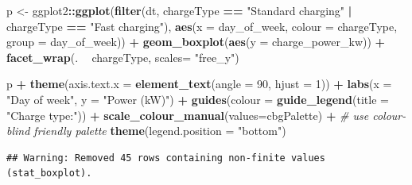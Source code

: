 \documentclass[]{article}
\newenvironment{Shaded}{\begin{snugshade}}{\end{snugshade}}
\newcommand{\KeywordTok}[1]{\textcolor[rgb]{0.13,0.29,0.53}{\textbf{#1}}}
\newcommand{\DataTypeTok}[1]{\textcolor[rgb]{0.13,0.29,0.53}{#1}}
\newcommand{\DecValTok}[1]{\textcolor[rgb]{0.00,0.00,0.81}{#1}}
\newcommand{\StringTok}[1]{\textcolor[rgb]{0.31,0.60,0.02}{#1}}
\newcommand{\CommentTok}[1]{\textcolor[rgb]{0.56,0.35,0.01}{\textit{#1}}}
\newcommand{\OperatorTok}[1]{\textcolor[rgb]{0.81,0.36,0.00}{\textbf{#1}}}
\newcommand{\NormalTok}[1]{#1}
\begin{document}
\begin{Shaded}
\begin{Highlighting}[]
\NormalTok{p <-}\StringTok{ }\NormalTok{ggplot2}\OperatorTok{::}\KeywordTok{ggplot}\NormalTok{(}\KeywordTok{filter}\NormalTok{(dt, chargeType }\OperatorTok{==}\StringTok{ "Standard charging"} \OperatorTok{|}\StringTok{ }\NormalTok{chargeType }\OperatorTok{==}\StringTok{ "Fast charging"}\NormalTok{), }\KeywordTok{aes}\NormalTok{(}\DataTypeTok{x =}\NormalTok{ day_of_week, }\DataTypeTok{colour =}\NormalTok{ chargeType, }\DataTypeTok{group =}\NormalTok{ day_of_week)) }\OperatorTok{+}
\StringTok{  }\KeywordTok{geom_boxplot}\NormalTok{(}\KeywordTok{aes}\NormalTok{(}\DataTypeTok{y =}\NormalTok{ charge_power_kw)) }\OperatorTok{+}
\StringTok{  }\KeywordTok{facet_wrap}\NormalTok{(. }\OperatorTok{~}\StringTok{ }\NormalTok{chargeType, }\DataTypeTok{scales=} \StringTok{"free_y"}\NormalTok{)}

\NormalTok{p }\OperatorTok{+}\StringTok{ }\KeywordTok{theme}\NormalTok{(}\DataTypeTok{axis.text.x =} \KeywordTok{element_text}\NormalTok{(}\DataTypeTok{angle =} \DecValTok{90}\NormalTok{, }\DataTypeTok{hjust =} \DecValTok{1}\NormalTok{)) }\OperatorTok{+}\StringTok{ }
\StringTok{  }\KeywordTok{labs}\NormalTok{(}\DataTypeTok{x =} \StringTok{"Day of week"}\NormalTok{,}
       \DataTypeTok{y =} \StringTok{"Power (kW)"}\NormalTok{) }\OperatorTok{+}
\StringTok{  }\KeywordTok{guides}\NormalTok{(}\DataTypeTok{colour =} \KeywordTok{guide_legend}\NormalTok{(}\DataTypeTok{title =} \StringTok{"Charge type:"}\NormalTok{)) }\OperatorTok{+}
\StringTok{  }\KeywordTok{scale_colour_manual}\NormalTok{(}\DataTypeTok{values=}\NormalTok{cbgPalette) }\OperatorTok{+}\StringTok{ }\CommentTok{# use colour-blind friendly palette}
\StringTok{  }\KeywordTok{theme}\NormalTok{(}\DataTypeTok{legend.position =} \StringTok{"bottom"}\NormalTok{)}
\end{Highlighting}
\end{Shaded}

\begin{verbatim}
## Warning: Removed 45 rows containing non-finite values (stat_boxplot).
\end{verbatim}
\end{document}
